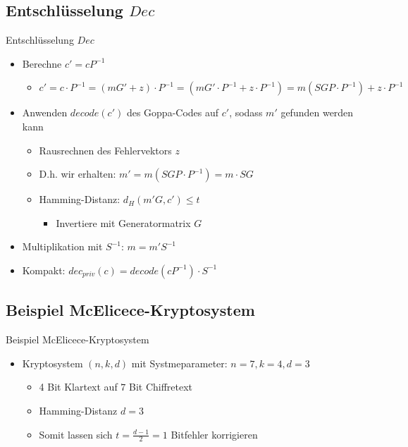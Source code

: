 \documentclass[11pt%
,aspectratio=169%
]{beamer}
\begin{document}
\subsection{Entschlüsselung $Dec$}
\begin{frame}{Entschlüsselung $Dec$}
    \begin{itemize}
        \item Berechne $c' = cP^{-1}$
        \begin{itemize}
            \item $c' = c \cdot P^{-1} = (mG' + z) \cdot P^{-1} = (mG'\cdot P^{-1} + z\cdot P^{-1}) = m (SGP\cdot P^{-1}) + z\cdot P^{-1}$
        \end{itemize}
        \item Anwenden $decode(c')$ des Goppa-Codes auf $c'$, sodass $m'$ gefunden werden kann
        \begin{itemize}
            \item Rausrechnen des Fehlervektors $z$
            \item D.h. wir erhalten: $m' = m (SGP\cdot P^{-1}) = m\cdot SG$
            \item Hamming-Distanz: $d_H(m'G, c') \leq t$
            \begin{itemize}
                \item Invertiere mit Generatormatrix $G$ 
            \end{itemize}
        \end{itemize}
        \item Multiplikation mit $S^{-1}$: $m = m'S^{-1}$
        \item Kompakt: $dec_{priv}(c) = decode(cP^{-1}) \cdot S^{-1}$

    \end{itemize}    
\end{frame}

\subsection{Beispiel McElicece-Kryptosystem}
\begin{frame}{Beispiel McElicece-Kryptosystem}
    \begin{itemize}
        \item Kryptosystem $(n,k,d)$ mit Systmeparameter: $n=7, k=4, d=3$
        \begin{itemize}
            \item 4 Bit Klartext auf $7$ Bit Chiffretext
            \item Hamming-Distanz $d=3$
            \item Somit lassen sich $t = \frac{d-1}{2} = 1$ Bitfehler korrigieren
        \end{itemize}
    \end{itemize}
\end{frame}
\end{document}
